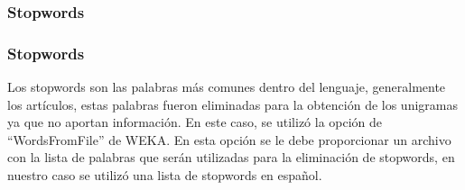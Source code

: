 \documentclass{beamer}
\begin{document}
\subsubsection{Stopwords}
\begin{frame}
\frametitle{Stopwords}
Los stopwords son las palabras más comunes dentro del lenguaje, generalmente los artículos, estas palabras fueron eliminadas para la obtención de los unigramas ya que no aportan información. En este caso, se utilizó la opción de “WordsFromFile” de WEKA. En esta opción se le debe proporcionar un archivo con la lista de palabras que serán utilizadas para la eliminación de stopwords, en nuestro caso se utilizó una lista de stopwords en español. 

\end{frame}
\end{document}
